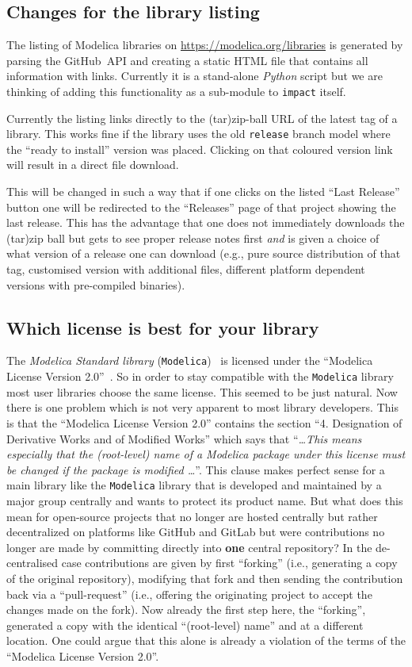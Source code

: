 \documentclass[11pt,a4paper,twocolumn]{article}
\newcommand{\code}[1]{\texttt{#1}} %
\begin{document}
\subsection{Changes for the library listing}
The listing of Modelica libraries on
\url{https://modelica.org/libraries} is generated by parsing the
GitHub~API and creating a static HTML file that contains all
information with links. Currently it is a stand-alone \emph{Python}
script but we are thinking of adding this functionality as a
sub-module to \code{impact} itself.

Currently the listing links directly to the (tar)zip-ball URL of the
latest tag of a library. This works fine if the library uses the old
\texttt{release} branch model where the ``ready to install'' version was
placed.  Clicking on that coloured version link will result in a direct file download.

This will be changed in such a way that if one clicks on the listed
``Last Release'' button one will be redirected to the ``Releases'' page of
that project showing the last release. This has the advantage that one
does not immediately downloads the (tar)zip ball but gets to see
proper release notes first \emph{and} is given a choice of what
version of a release one can download (e.g., pure source distribution
of that tag, customised version with additional files, different
platform dependent versions with pre-compiled binaries).

\subsection{Which license is best for your library}
The \emph{Modelica Standard library} (\texttt{Modelica})~\parencite{MSL} is licensed under
the ``Modelica License Version 2.0''~\parencite{MoLic2}. So in order
to stay compatible with the \texttt{Modelica} library most user libraries choose the
same license. This seemed to be just natural. Now there is one problem
which is not very apparent to most library developers. This is that
the ``Modelica License Version 2.0'' contains the section
``4. Designation of Derivative Works and of Modified Works'' which
says that ``\emph{\ldots This means especially that the (root-level)
  name of a Modelica package under this license must be changed if the
  package is modified \ldots}''.
This clause makes perfect sense for a main library like the
\texttt{Modelica} library that is developed and maintained by a major
group centrally and wants to protect its product name.
But what does this mean for open-source projects that no longer are
hosted centrally but rather decentralized on platforms like GitHub and
GitLab but were contributions no longer are made by committing
directly into \textbf{one} central repository? In the de-centralised
case contributions are given by first ``forking'' (i.e., generating a
copy of the original repository), modifying that fork and then sending
the contribution back via a ``pull-request'' (i.e., offering the
originating project to accept the changes made on the fork). Now
already the first step here, the ``forking'', generated a copy with the
identical ``(root-level) name'' and at a different location. One could argue that this
alone is already a violation of the terms of the ``Modelica License
Version 2.0''.
\end{document}
